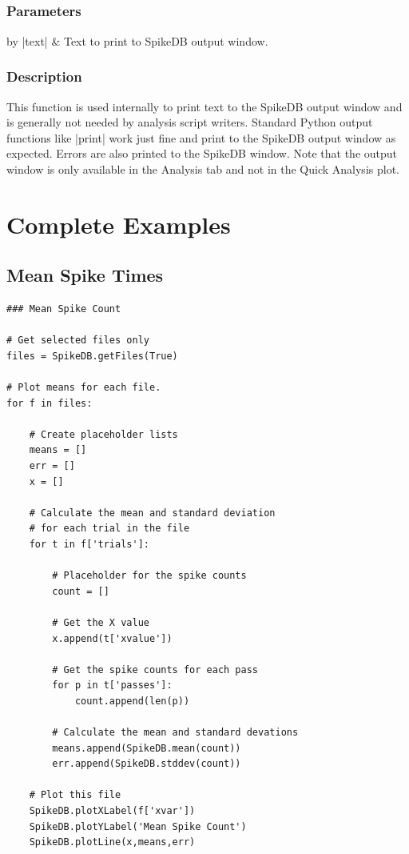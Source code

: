 \documentclass{report}
\begin{document}
\clearpage
\subsection{}
\subsubsection{Parameters}
\begin{center}
\begin{tabular}{by}
		|text| & Text to print to SpikeDB output window.\\
	\end{tabular}
\end{center}
\subsubsection{Description}
This function is used internally to print text to the SpikeDB output window and is generally not needed by analysis script writers. Standard Python output functions like |print| work just fine and print to the SpikeDB output window as expected. Errors are also printed to the SpikeDB window. Note that the output window is only available in the Analysis tab and not in the Quick Analysis plot.

\clearpage
\section{Complete Examples}
\subsection{Mean Spike Times}
\begin{lstlisting}[label=codeMean,caption=Calculating the mean spike counts.]
### Mean Spike Count

# Get selected files only
files = SpikeDB.getFiles(True)

# Plot means for each file.
for f in files:

	# Create placeholder lists
	means = []
	err = []
	x = []

	# Calculate the mean and standard deviation
	# for each trial in the file
	for t in f['trials']:
		
		# Placeholder for the spike counts
		count = []
		
		# Get the X value
		x.append(t['xvalue'])	

		# Get the spike counts for each pass
		for p in t['passes']:
			count.append(len(p))

		# Calculate the mean and standard devations
		means.append(SpikeDB.mean(count))
		err.append(SpikeDB.stddev(count))

	# Plot this file
	SpikeDB.plotXLabel(f['xvar'])
	SpikeDB.plotYLabel('Mean Spike Count')
	SpikeDB.plotLine(x,means,err)

\end{lstlisting}
\end{document}
